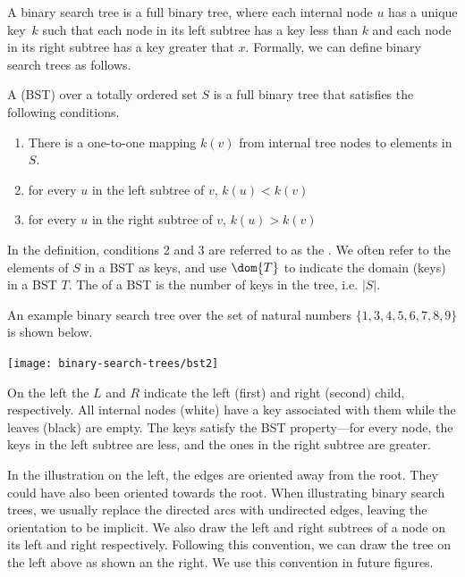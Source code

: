 A binary search tree is a full binary tree, where each internal node
$u$ has a unique key~$k$ such that each node in its left subtree has a
key less than $k$ and each node in its right subtree has a key greater
that $x$.  
%
Formally, we can define binary search trees as follows.
%
\begin{definition}
\label{def:bst::bst}
A  (BST) over a totally ordered set $S$ is a
full binary tree that satisfies the following conditions.
\begin{enumerate}
 \item There is a one-to-one mapping $k(v)$ from internal tree nodes to elements in $S$.
 \item for every $u$ in the left subtree of $v$, $k(u) < k(v)$
 \item for every $u$ in the right subtree of $v$, $k(u) > k(v)$
\end{enumerate}
%
In the definition, conditions 2 and 3 are referred to as the .  We often refer to the elements of $S$ in a BST as keys,
and use $\dom{T}$ to indicate the domain (keys) in a BST $T$.  The
 of a BST is the number of keys in the tree, i.e. $|S|$.



\end{definition}

\begin{example}
\label{ex:bst}
An example binary search tree over the set of natural numbers
$\{1,3,4,5,6,7,8,9\}$ is shown below.
\begin{center}
  \texttt{[image: binary-search-trees/bst2]}~~~~~~~
\end{center}
On the left the $L$ and $R$ indicate the left (first) and right
(second) child, respectively.  All internal nodes (white) have a key
associated with them while the leaves (black) are empty.  The keys
satisfy the BST property---for every node, the keys in the left
subtree are less, and the ones in the right subtree are greater. 


\smallskip 

In the illustration on the left, the edges are oriented away from the
root. They could have also been oriented towards the root.
%
When illustrating binary search trees, we usually replace the directed
arcs with undirected edges, leaving the orientation to be implicit.
%
We also draw the left and right subtrees of a node on its left and
right respectively.
%
Following this convention, we can draw the tree on the left above as
shown an the right.
%
We use this convention in future figures.
\end{example}



